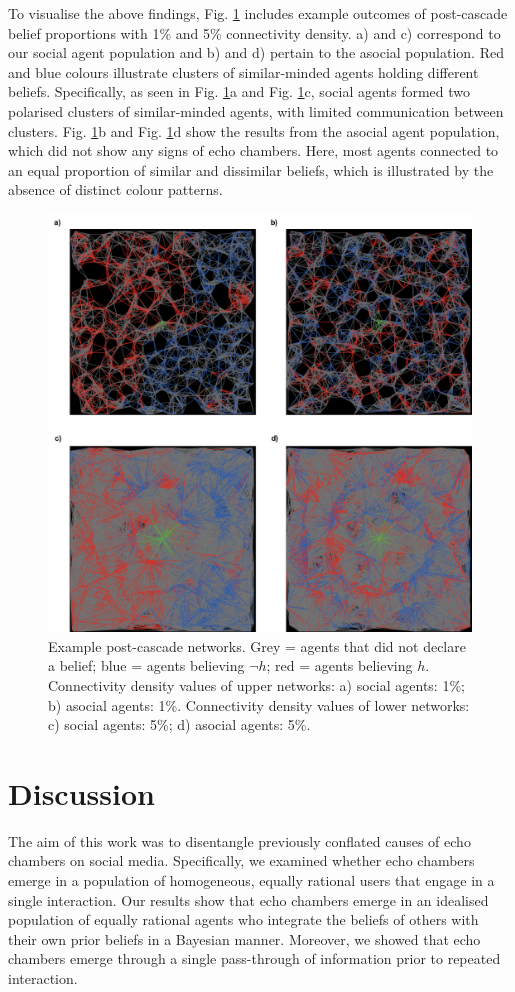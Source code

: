 \documentclass[fleqn,10pt]{wlscirep}
\begin{document}
To visualise the above findings, Fig. \ref{fig:example} includes example outcomes of post-cascade belief proportions with 1\% and 5\% connectivity density. a) and c) correspond to our social agent population and b) and d) pertain to the asocial population. Red and blue colours illustrate clusters of similar-minded agents holding different beliefs. Specifically, as seen in  Fig. \ref{fig:example}a and  Fig. \ref{fig:example}c, social agents formed two polarised clusters of similar-minded agents, with limited communication between clusters. Fig. \ref{fig:example}b and  Fig. \ref{fig:example}d show the results from the asocial agent population, which did not show any signs of echo chambers. Here, most agents connected to an equal proportion of similar and dissimilar beliefs, which is illustrated by the absence of distinct colour patterns.


\begin{figure}[ht]
\centering
\includegraphics[width=0.8\columnwidth]{figure3.pdf}
\caption{Example post-cascade networks. Grey = agents that did not declare a belief; blue = agents believing \(\neg h\); red = agents believing \(h\). Connectivity density values of upper networks: a) social agents: 1\%; b) asocial agents: 1\%. Connectivity density values of lower networks: c) social agents: 5\%; d) asocial agents: 5\%.}
\label{fig:example}
\end{figure}

\section*{Discussion}
The aim of this work was to disentangle previously conflated causes of echo chambers on social media. Specifically, we examined whether echo chambers emerge in a population of homogeneous, equally rational users that engage in a single interaction. Our results show that echo chambers emerge in an idealised population of equally rational agents who integrate the beliefs of others with their own prior beliefs in a Bayesian manner. Moreover, we showed that echo chambers emerge through a single pass-through of information prior to repeated interaction.
\end{document}
